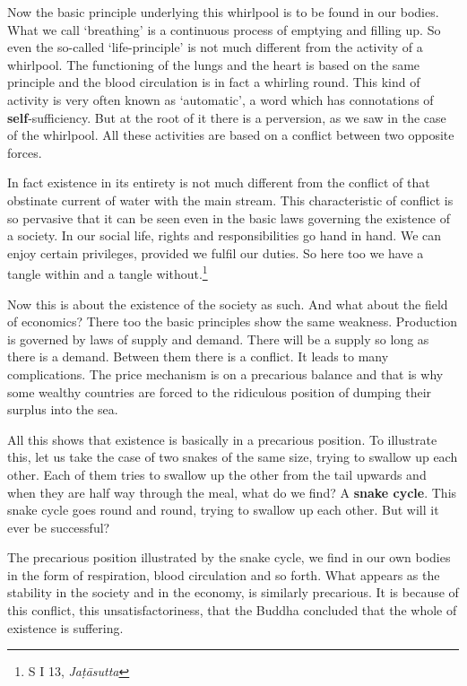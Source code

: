 Now the basic principle underlying this whirlpool is to be found in our bodies. What we call `breathing' is a continuous process of emptying and filling up. So even the so-called `life-principle' is not much different from the activity of a whirlpool. The functioning of the lungs and the heart is based on the same principle and the blood circulation is in fact a whirling round. This kind of activity is very often known as `automatic', a word which has connotations of \textbf{self}-sufficiency. But at the root of it there is a perversion, as we saw in the case of the whirlpool. All these activities are based on a conflict between two opposite forces.

In fact existence in its entirety is not much different from the conflict of that obstinate current of water with the main stream. This characteristic of conflict is so pervasive that it can be seen even in the basic laws governing the existence of a society. In our social life, rights and responsibilities go hand in hand. We can enjoy certain privileges, provided we fulfil our duties. So here too we have a tangle within and a tangle without.\footnote{S I 13, \emph{Jaṭāsutta}}

Now this is about the existence of the society as such. And what about the field of economics? There too the basic principles show the same weakness. Production is governed by laws of supply and demand. There will be a supply so long as there is a demand. Between them there is a conflict. It leads to many complications. The price mechanism is on a precarious balance and that is why some wealthy countries are forced to the ridiculous position of dumping their surplus into the sea.

All this shows that existence is basically in a precarious position. To illustrate this, let us take the case of two snakes of the same size, trying to swallow up each other. Each of them tries to swallow up the other from the tail upwards and when they are half way through the meal, what do we find? A \textbf{snake cycle}. This snake cycle goes round and round, trying to swallow up each other. But will it ever be successful?

The precarious position illustrated by the snake cycle, we find in our own bodies in the form of respiration, blood circulation and so forth. What appears as the stability in the society and in the economy, is similarly precarious. It is because of this conflict, this unsatisfactoriness, that the Buddha concluded that the whole of existence is suffering.

